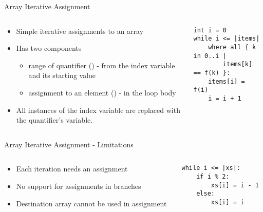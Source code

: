 \begin{frame}[fragile]{Array Iterative Assignment}

\begin{columns}

\begin{column}{0.5\textwidth}

\begin{itemize}
    \item Simple iterative assignments to an array
    \item Has two components
    \begin{itemize}
        \item range of quantifier () - from the index variable and its
            starting value
        \item assignment to an element () - in the loop
            body
    \end{itemize}
    \item All instances of the index variable are replaced with the
        quantifier's variable.
\end{itemize}

\end{column}

\begin{column}{0.5\textwidth}
\begin{verbatim}
int i = 0
while i <= |items|
    where all { k in 0..i |
        items[k] == f(k) }:
    items[i] = f(i)
    i = i + 1
\end{verbatim}
\end{column}

\end{columns}

\end{frame}



\begin{frame}[fragile]{Array Iterative Assignment - Limitations}
\begin{columns}

\begin{column}{0.5\textwidth}
\begin{itemize}
    \item Each iteration needs an assignment
    \item No support for assignments in branches
    \item Destination array cannot be used in assignment
\end{itemize}
\end{column}

\begin{column}{0.5\textwidth}
\begin{verbatim}
while i <= |xs|:
    if i % 2:
        xs[i] = i - 1
    else:
        xs[i] = i
\end{verbatim}
\end{column}
\end{columns}
\end{frame}

